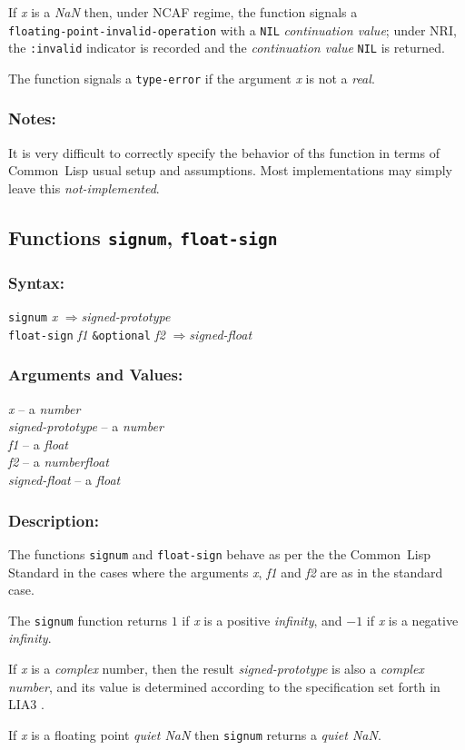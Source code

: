 \documentclass[10pt,fleqn]{article}
\newcommand{\CL}{\textsf{Common~Lisp}}
\newcommand{\code}[1]{\texttt{#1}}
\newcommand{\clieeeterm}[1]{\textit{#1}}
\newcommand{\clliaterm}[1]{\textit{#1}}
\newcommand{\varname}[1]{\textit{#1}}
\newcommand{\clterm}[1]{\textit{#1}}
\newcommand{\RArrow}{$\Rightarrow$}
\newcommand{\DDictionaryItem}[1]{\vspace*{6pt}\noindent\hrulefill\vspace*{-9pt}\subsection*{#1}}
\newcommand{\DSyntax}{\subsubsection*{Syntax:}}
\newcommand{\DArgsNValues}{\subsubsection*{Arguments and Values:}}
\newcommand{\DDescription}{\subsubsection*{Description:}}
\newcommand{\DNotes}{\subsubsection*{Notes:}}
\begin{document}
If \varname{x} is a \clieeeterm{NaN} then, under NCAF regime, the
function signals a\\
\code{floating-point-invalid-operation} with a
\code{NIL} \clieeeterm{continuation value}; under NRI, the
\code{:invalid} indicator is recorded and the \clieeeterm{continuation
  value} \code{NIL} is returned.

The function signals a \code{type-error} if the argument \varname{x}
is not a \clterm{real}.

\DNotes{}

It is very difficult to correctly specify the behavior of ths function
in terms of \CL{} usual setup and assumptions.  Most implementations
may simply leave this \clliaterm{not-implemented}.


\DDictionaryItem{Functions \code{signum}, \code{float-sign}}
\index{S!\code{signum}}
\index{F!\code{float-sign}}


\DSyntax{}

\code{signum} \varname{x} \RArrow \varname{signed-prototype}\\
\code{float-sign} \varname{f1} \code{\&optional} \varname{f2}
\RArrow \varname{signed-float}


\DArgsNValues{}

\varname{x} -- a \clterm{number}\\
\varname{signed-prototype} -- a \clterm{number}\\
\varname{f1} -- a \clterm{float}\\
\varname{f2} -- a \clterm{numberfloat}\\
\varname{signed-float} -- a \clterm{float}


\DDescription{}

The functions \code{signum} and \code{float-sign} behave as per the
the \CL{} Standard \cite{1994:ANSICL} in the cases where the arguments
\varname{x}, \varname{f1} and \varname{f2} are as in the standard case.

The \code{signum} function returns $1$ if \varname{x} is a positive
\clliaterm{infinity}, and  $-1$ if \varname{x} is a negative
\clliaterm{infinity}.

If \varname{x} is a \clterm{complex} number, then the result
\varname{signed-prototype} is also a \clterm{complex number}, and its
value is determined according to the specification set forth in LIA3
\cite{2004:LIA3}.

If \varname{x} is a floating point \clliaterm{quiet NaN} then
\code{signum} returns a \clliaterm{quiet NaN}.
\end{document}
